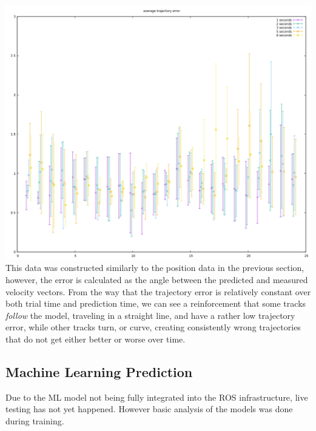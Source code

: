 \documentclass[10pt,a4paper]{article}
\begin{document}
\includegraphics[width=\textwidth]{../graphs/average_trajectory_error.png}\\
This data was constructed similarly to the position data in the previous section, however, the error is calculated as the angle between the predicted and measured velocity vectors. From the way that the trajectory error is relatively constant over both trial time and prediction time, we can see a reinforcement that some tracks \textit{follow} the model, traveling in a straight line, and have a rather low trajectory error, while other tracks turn, or curve, creating consistently wrong trajectories that do not get either better or worse over time.

\subsection{Machine Learning Prediction}
Due to the ML model not being fully integrated into the ROS infrastructure, live testing has not yet happened. However basic analysis of the models was done during training.
\end{document}

